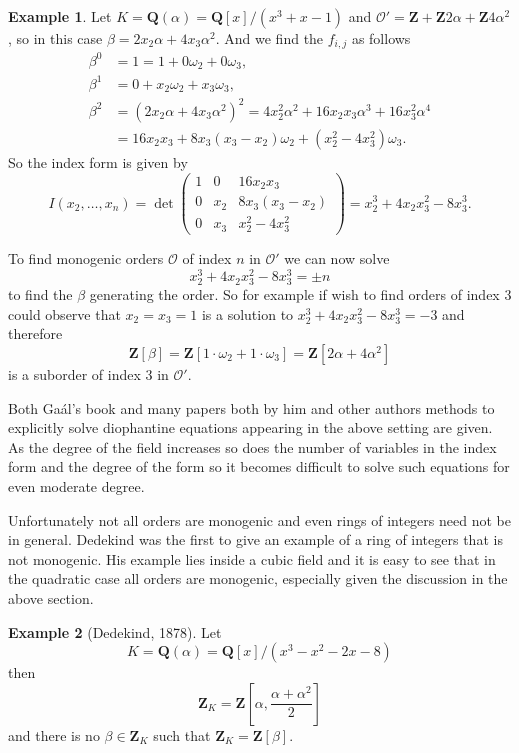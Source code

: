 \documentclass[12pt,a4paper,abstracton,bibtotoc]{scrreprt}
\theoremstyle{definition}
\newtheorem{ex}{Example}
\newcommand{\QQ}{\mathbf{Q}}
\newcommand{\ZZ}{\mathbf{Z}}
\renewcommand{\O}{\mathcal{O}}
\begin{document}
\begin{ex}
Let $K = \QQ(\alpha) = \QQ[x]/(x^3 + x - 1)$ and $\O' = \ZZ + \ZZ2\alpha + \ZZ4\alpha^2$, so in this case $\beta = 2x_2\alpha + 4x_3\alpha^2$.
And we find the $f_{i,j}$ as follows
\begin{align*}
\beta^0 &= 1 = 1 + 0\omega_2 + 0\omega_3,\\
\beta^1 &= 0 + x_2\omega_2 + x_3\omega_3,\\
\beta^2 &= (2x_2\alpha + 4x_3\alpha^2)^2 = 4x_2^2\alpha^2 + 16x_2x_3\alpha^3 + 16x_3^2\alpha^4 \\
&= 16x_2x_3 + 8x_3(x_3-x_2)\omega_2 + (x_2^2 - 4x_3^2)\omega_3.
\end{align*}
So the index form is given by
\[
I(x_2,\ldots,x_n) = \det\begin{pmatrix}
1 & 0   &  16x_2x_3\\
0 & x_2 & 8x_3(x_3-x_2)\\
0 & x_3 & x_2^2 -4x_3^2
\end{pmatrix}
= x_2^3 + 4x_2x_3^2 - 8x_3^3.
\]

To find monogenic orders $\O$ of index $n$ in $\O'$ we can now solve 
\[x_2^3 + 4x_2x_3^2 - 8x_3^3 = \pm n\]
to find the $\beta$ generating the order.
So for example if wish to find orders of index 3 could observe that $x_2 = x_3 = 1$ is a solution to $x_2^3 + 4x_2x_3^2 - 8x_3^3 = -3$ and therefore
\[
\ZZ[\beta] = \ZZ[1\cdot\omega_2 + 1\cdot \omega_3] = \ZZ[2\alpha + 4\alpha^2]
\]
is a suborder of index 3 in $\O'$.
\end{ex}

Both Ga\'al's book and many papers both by him and other authors methods to explicitly solve diophantine equations appearing in the above setting are given.
As the degree of the field increases so does the number of variables in the index form and the degree of the form so it becomes difficult to solve such equations for even moderate degree.

Unfortunately not all orders are monogenic and even rings of integers need not be in general.
Dedekind was the first to give an example of a ring of integers that is not monogenic.
His example lies inside a cubic field and it is easy to see that in the quadratic case all orders are monogenic, especially given the discussion in the above section.

\begin{ex}[Dedekind, 1878]
Let 
\[
K = \QQ(\alpha) = \QQ[x]/(x^3 -x^2 -2x-8)
\]
then
\[
\ZZ_K=\ZZ\left[ \alpha,\frac{\alpha + \alpha^2}{2}\right]
\]
and there is no $\beta\in \ZZ_K$ such that $\ZZ_K=\ZZ[\beta]$. %
\end{ex}
\end{document}
